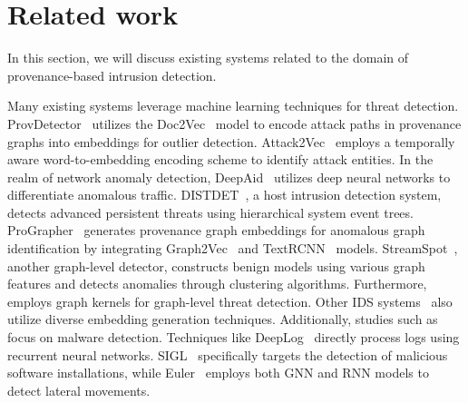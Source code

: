 \section{Related work}
\label{s:relwk}

In this section, we will discuss existing systems related to the domain of provenance-based intrusion detection.

 Many existing systems leverage machine learning techniques for threat detection. ProvDetector~\cite{provdetector2020} utilizes the Doc2Vec~\cite{le2014distributed} model to encode attack paths in provenance graphs into embeddings for outlier detection. Attack2Vec~\cite{shen2019attack2vec} employs a temporally aware word-to-embedding encoding scheme to identify attack entities. In the realm of network anomaly detection, DeepAid~\cite{deepaid} utilizes deep neural networks to differentiate anomalous traffic. DISTDET~\cite{dong2023distdet}, a host intrusion detection system, detects advanced persistent threats using hierarchical system event trees. ProGrapher~\cite{yangprographer} generates provenance graph embeddings for anomalous graph identification by integrating Graph2Vec~\cite{narayanan2017graph2vec} and TextRCNN~\cite{lai2015recurrent} models. StreamSpot~\cite{streamspot}, another graph-level detector, constructs benign models using various graph features and detects anomalies through clustering algorithms. Furthermore, \unicorn~\cite{han2020unicorn} employs graph kernels for graph-level threat detection. Other IDS systems~\cite{aljawarneh2018anomaly, maseer2021benchmarking, gyanchandani2012taxonomy,atlas} also utilize diverse embedding generation techniques. Additionally, studies such as \cite{zolkipli2011approach, chakkaravarthy2019survey, isohara2011kernel} focus on malware detection. Techniques like DeepLog~\cite{deeplog2017} directly process logs using recurrent neural networks. SIGL~\cite{sigl} specifically targets the detection of malicious software installations, while Euler~\cite{king2022euler} employs both GNN and RNN models to detect lateral movements.




 

 


 


